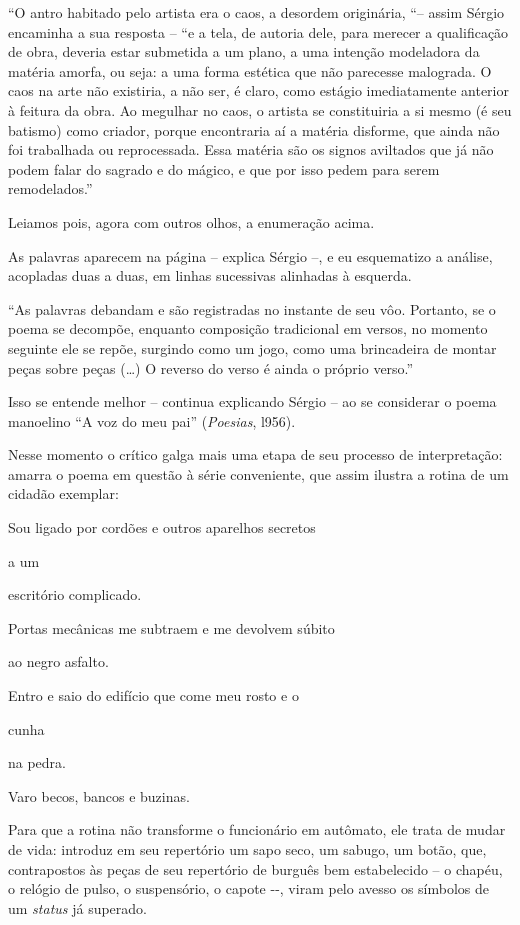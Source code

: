``O antro habitado pelo artista era o caos, a desordem originária, ``--
assim Sérgio encaminha a sua resposta -- ``e a tela, de autoria dele,
para merecer a qualificação de obra, deveria estar submetida a um plano,
a uma intenção modeladora da matéria amorfa, ou seja: a uma forma
estética que não parecesse malograda. O caos na arte não existiria, a
não ser, é claro, como estágio imediatamente anterior à feitura da obra.
Ao megulhar no caos, o artista se constituiria a si mesmo (é seu
batismo) como criador, porque encontraria aí a matéria disforme, que
ainda não foi trabalhada ou reprocessada. Essa matéria são os signos
aviltados que já não podem falar do sagrado e do mágico, e que por isso
pedem para serem remodelados.''

Leiamos pois, agora com outros olhos, a enumeração acima.

As palavras aparecem na página -- explica Sérgio --, e eu esquematizo a
análise, acopladas duas a duas, em linhas sucessivas alinhadas à
esquerda.

``As palavras debandam e são registradas no instante de seu vôo.
Portanto, se o poema se decompõe, enquanto composição tradicional em
versos, no momento seguinte ele se repõe, surgindo como um jogo, como
uma brincadeira de montar peças sobre peças (\ldots{}) O reverso do verso é
ainda o próprio verso.''

Isso se entende melhor -- continua explicando Sérgio -- ao se considerar
o poema manoelino ``A voz do meu pai'' (\emph{Poesias}, l956).

Nesse momento o crítico galga mais uma etapa de seu processo de
interpretação: amarra o poema em questão à série conveniente, que assim
ilustra a rotina de um cidadão exemplar:

Sou ligado por cordões e outros aparelhos secretos

a um

escritório complicado.

Portas mecânicas me subtraem e me devolvem súbito

ao negro asfalto.

Entro e saio do edifício que come meu rosto e o

cunha

na pedra.

Varo becos, bancos e buzinas.

Para que a rotina não transforme o funcionário em autômato, ele trata de
mudar de vida: introduz em seu repertório um sapo seco, um sabugo, um
botão, que, contrapostos às peças de seu repertório de burguês bem
estabelecido -- o chapéu, o relógio de pulso, o suspensório, o capote
-\/-, viram pelo avesso os símbolos de um \emph{status} já superado.

